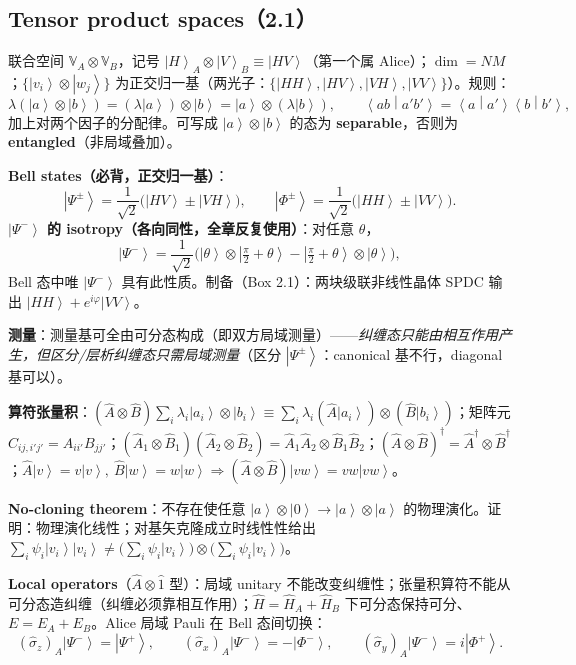 \documentclass[11pt]{ctexart}
\newcommand{\ket}[1]{\left|#1\right\rangle}
\newcommand{\braket}[2]{\left\langle#1\middle|#2\right\rangle}
\newcommand{\op}[1]{\hat{#1}}
\begin{document}
\subsection{Tensor product spaces（2.1）}

联合空间 $\mathbb V_A\otimes\mathbb V_B$，记号 $\ket H_A\otimes\ket V_B\equiv\ket{HV}$（第一个属 Alice）；$\dim=NM$；$\{\ket{v_i}\otimes\ket{w_j}\}$ 为正交归一基（两光子：$\{\ket{HH},\ket{HV},\ket{VH},\ket{VV}\}$）。规则：
\[
\lambda(\ket a\otimes\ket b)=(\lambda\ket a)\otimes\ket b=\ket a\otimes(\lambda\ket b),\qquad
\braket{ab}{a'b'}=\braket a{a'}\braket b{b'},
\]
加上对两个因子的分配律。可写成 $\ket a\otimes\ket b$ 的态为 \textbf{separable}，否则为 \textbf{entangled}（非局域叠加）。

\textbf{Bell states（必背，正交归一基）}：
\[
\ket{\Psi^\pm}=\frac{1}{\sqrt2}\big(\ket{HV}\pm\ket{VH}\big),\qquad
\ket{\Phi^\pm}=\frac{1}{\sqrt2}\big(\ket{HH}\pm\ket{VV}\big).
\]
\textbf{$\ket{\Psi^-}$ 的 isotropy（各向同性，全章反复使用）}：对任意 $\theta$，
\[
\ket{\Psi^-}=\frac{1}{\sqrt2}\Big(\ket\theta\otimes\ket{\tfrac\pi2+\theta}-\ket{\tfrac\pi2+\theta}\otimes\ket\theta\Big),
\]
Bell 态中唯 $\ket{\Psi^-}$ 具有此性质。制备（Box 2.1）：两块级联非线性晶体 SPDC 输出 $\ket{HH}+e^{i\varphi}\ket{VV}$。

\textbf{测量}：测量基可全由可分态构成（即双方局域测量）——\emph{纠缠态只能由相互作用产生，但区分/层析纠缠态只需局域测量}（区分 $\ket{\Psi^\pm}$：canonical 基不行，diagonal 基可以）。

\textbf{算符张量积}：$(\op A\otimes\op B)\sum_i\lambda_i\ket{a_i}\otimes\ket{b_i}\equiv\sum_i\lambda_i(\op A\ket{a_i})\otimes(\op B\ket{b_i})$；矩阵元 $C_{ij,i'j'}=A_{ii'}B_{jj'}$；$(\op A_1\otimes\op B_1)(\op A_2\otimes\op B_2)=\op A_1\op A_2\otimes\op B_1\op B_2$；$(\op A\otimes\op B)^\dagger=\op A^\dagger\otimes\op B^\dagger$；$\op A\ket v=v\ket v,\ \op B\ket w=w\ket w\Rightarrow(\op A\otimes\op B)\ket{vw}=vw\ket{vw}$。

\textbf{No-cloning theorem}：不存在使任意 $\ket a\otimes\ket0\to\ket a\otimes\ket a$ 的物理演化。证明：物理演化线性；对基矢克隆成立时线性性给出 $\sum_i\psi_i\ket{v_i}\ket{v_i}\neq\big(\sum_i\psi_i\ket{v_i}\big)\otimes\big(\sum_i\psi_i\ket{v_i}\big)$。

\textbf{Local operators}（$\op A\otimes\op1$ 型）：局域 unitary 不能改变纠缠性；张量积算符不能从可分态造纠缠（纠缠必须靠相互作用）；$\op H=\op H_A+\op H_B$ 下可分态保持可分、$E=E_A+E_B$。Alice 局域 Pauli 在 Bell 态间切换：
\[
(\op\sigma_z)_A\ket{\Psi^-}=\ket{\Psi^+},\qquad
(\op\sigma_x)_A\ket{\Psi^-}=-\ket{\Phi^-},\qquad
(\op\sigma_y)_A\ket{\Psi^-}=i\ket{\Phi^+}.
\]
\end{document}
